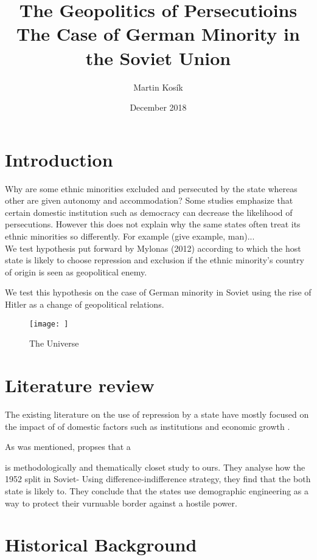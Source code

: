 \documentclass[12pt]{article}
\title{The Geopolitics of Persecutioins \\
  \large The Case of German Minority in the Soviet Union}
\author{Martin Kosík}
\date{December 2018}
\begin{document}
\maketitle


\section{Introduction}
Why are some ethnic minorities excluded and persecuted by the state whereas other are given autonomy and accommodation? Some studies emphasize that certain domestic institution such as democracy can decrease the likelihood of persecutions. However this does not explain why the same states often treat its ethnic minorities so differently.  For example (give example, man)...\\
We test hypothesis put forward by Mylonas (2012) according to which the host state is likely to choose repression and exclusion if the ethnic minority's country of origin is seen as geopolitical enemy. 

We test this hypothesis on the case of German minority in Soviet using the rise of Hitler as a change of geopolitical relations. 


\begin{figure}[h!]
\centering
\texttt{[image: ]}
\caption{The Universe}
\label{fig:universe}
\end{figure}
\section{Literature review}
The existing literature on the use of repression by a state have mostly focused on the impact of  of domestic factors such as institutions and economic growth \citep{davenport_state_2007, davenport_state_2007-1}.

As was mentioned, \citet{mylonas_politics_2013} propses that a

 \citet{blaydes_state_2018} 

\citet{mcnamee_demographic_nodate} is methodologically and thematically closet study to ours. They analyse how the 1952 split in Soviet-
Using difference-indifference strategy, they find that the both state is likely to. They conclude that the states use demographic engineering as a way to protect their vurnuable border against a hostile power.  

\section{Historical Background}
\end{document}

